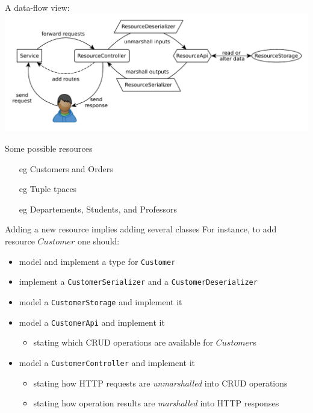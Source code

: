 \documentclass[presentation]{beamer}\mode<presentation>{\usetheme{AMSCesenaPurpleAndGold}}
\begin{document}
\begin{frame}[allowframebreaks]
    \framebreak

    A data-flow view:
    \includegraphics[width=\linewidth]{img/data-flow.pdf}

    \framebreak

    \begin{exampleblock}{Some possible resources}
        \begin{itemize}
            \item[eg] Customers and Orders
            \item[eg] Tuple tpaces
            \item[eg] Departements, Students, and Professors 
        \end{itemize}
    \end{exampleblock}

    \begin{alertblock}{Adding a new resource implies adding several classes}
        For instance, to add resource $Customer$ one should:
        \begin{itemize}
            \item model and implement a type for \texttt{Customer}
            \item implement a \texttt{CustomerSerializer} and a \texttt{CustomerDeserializer}
            \item model a \texttt{CustomerStorage} and implement it
            \item model a \texttt{CustomerApi} and implement it
            \begin{itemize}
                \item stating which CRUD operations are available for $Customer$s
            \end{itemize}
            \item model a \texttt{CustomerController} and implement it
            \begin{itemize}
                \item stating how HTTP requests are \emph{unmarshalled} into CRUD operations
                \item stating how operation results are \emph{marshalled} into HTTP responses
            \end{itemize}
        \end{itemize}
    \end{alertblock}


\end{frame}
\end{document}
